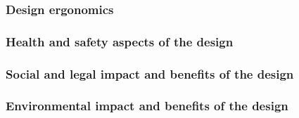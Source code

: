 \subsubsection{Design ergonomics}

\subsubsection{Health and safety aspects of the design}

\subsubsection{Social and legal impact and benefits of the design}

\subsubsection{Environmental impact and benefits of the design}